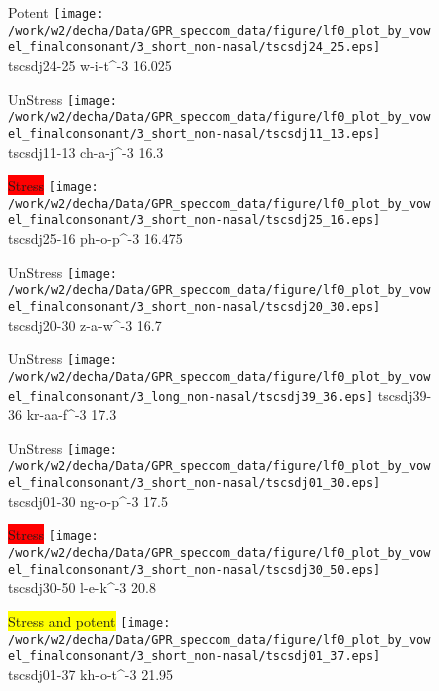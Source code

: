 \documentclass{article}
\begin{document}
\begin{figure}[t]
\begin{minipage}[b]{.24\textwidth}
\colorbox{Apricot}{Potent}
\centering
\texttt{[image: /work/w2/decha/Data/GPR\_speccom\_data/figure/lf0\_plot\_by\_vowel\_finalconsonant/3\_short\_non-nasal/tscsdj24\_25.eps]}
tscsdj24-25 w-i-t\textasciicircum-3 16.025
\end{minipage}
\begin{minipage}[b]{.24\textwidth}
UnStress
\centering
\texttt{[image: /work/w2/decha/Data/GPR\_speccom\_data/figure/lf0\_plot\_by\_vowel\_finalconsonant/3\_short\_non-nasal/tscsdj11\_13.eps]}
tscsdj11-13 ch-a-j\textasciicircum-3 16.3
\end{minipage}
\begin{minipage}[b]{.24\textwidth}
\colorbox{red}{Stress}
\centering
\texttt{[image: /work/w2/decha/Data/GPR\_speccom\_data/figure/lf0\_plot\_by\_vowel\_finalconsonant/3\_short\_non-nasal/tscsdj25\_16.eps]}
tscsdj25-16 ph-o-p\textasciicircum-3 16.475
\end{minipage}
\begin{minipage}[b]{.24\textwidth}
UnStress
\centering
\texttt{[image: /work/w2/decha/Data/GPR\_speccom\_data/figure/lf0\_plot\_by\_vowel\_finalconsonant/3\_short\_non-nasal/tscsdj20\_30.eps]}
tscsdj20-30 z-a-w\textasciicircum-3 16.7
\end{minipage}
\end{figure}
\clearpage
\begin{figure}[t]
\begin{minipage}[b]{.24\textwidth}
UnStress
\centering
\texttt{[image: /work/w2/decha/Data/GPR\_speccom\_data/figure/lf0\_plot\_by\_vowel\_finalconsonant/3\_long\_non-nasal/tscsdj39\_36.eps]}
tscsdj39-36 kr-aa-f\textasciicircum-3 17.3
\end{minipage}
\begin{minipage}[b]{.24\textwidth}
UnStress
\centering
\texttt{[image: /work/w2/decha/Data/GPR\_speccom\_data/figure/lf0\_plot\_by\_vowel\_finalconsonant/3\_short\_non-nasal/tscsdj01\_30.eps]}
tscsdj01-30 ng-o-p\textasciicircum-3 17.5
\end{minipage}
\begin{minipage}[b]{.24\textwidth}
\colorbox{red}{Stress}
\centering
\texttt{[image: /work/w2/decha/Data/GPR\_speccom\_data/figure/lf0\_plot\_by\_vowel\_finalconsonant/3\_short\_non-nasal/tscsdj30\_50.eps]}
tscsdj30-50 l-e-k\textasciicircum-3 20.8
\end{minipage}
\begin{minipage}[b]{.24\textwidth}
\colorbox{yellow}{Stress and potent}
\centering
\texttt{[image: /work/w2/decha/Data/GPR\_speccom\_data/figure/lf0\_plot\_by\_vowel\_finalconsonant/3\_short\_non-nasal/tscsdj01\_37.eps]}
tscsdj01-37 kh-o-t\textasciicircum-3 21.95
\end{minipage}
\end{figure}
\end{document}
